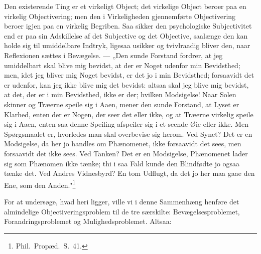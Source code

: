 \documentclass[12pt]{book}
\newcommand{\opage}[1]{\marginnote{\footnotesize\textit{[#1]}}}
\begin{document}
Den existerende Ting er et virkeligt Object; det virkelige Object beroer paa en virkelig
Objectivering; men den i Virkeligheden gjennemførte Objectivering beroer igjen paa en virkelig
Begriben. Saa sikker den psychologiske Subjectivitet end er paa sin Adskillelse af det
Subjective og det Objective, saalænge den kan holde sig til umiddelbare Indtryk, ligesaa usikker
og tvivlraadig bliver den, naar Reflexionen sættes i
\opage{172} Bevægelse. --- „Den sunde Forstand fordrer, at jeg umiddelbart skal blive mig bevidst, at der er
Noget udenfor min Bevidsthed; men, idet jeg bliver mig Noget bevidst, er det jo i min
Bevidsthed; forsaavidt det er udenfor, kan jeg ikke blive mig det bevidst: altsaa skal jeg blive
mig bevidst, at det, der er i min Bevidsthed, ikke er der; hvilken Modsigelse! Naar Solen
skinner og Træerne speile sig i Aaen, mener den sunde Forstand, at Lyset er Klarhed, enten der
er Nogen, der seer det eller ikke, og at Træerne virkelig speile sig i Aaen, enten saa denne
Speiling afspeiler sig i et seende Øie eller ikke. Men Spørgsmaalet er, hvorledes man skal
overbevise sig herom. Ved Synet? Det er en Modsigelse, da her jo handles om Phænomenet, ikke
forsaavidt det sees, men forsaavidt det ikke sees. Ved Tanken? Det er en Modsigelse, Phænomenet
lader sig som Phænomen ikke tænke; thi i saa Fald kunde den Blindfødte jo ogsaa tænke det. Ved
Andres Vidnesbyrd? En tom Udflugt, da det jo her maa gaae den Ene, som den
Anden."\footnote{Phil.\ Propæd.\ S.~41.}

For at undersøge, hvad heri ligger, ville vi i denne Sammenhæng henføre det almindelige
Objectiveringsproblem til de tre særskilte: Bevægelsesproblemet, Forandringsproblemet og
Mulighedsproblemet. Altsaa:
\end{document}
